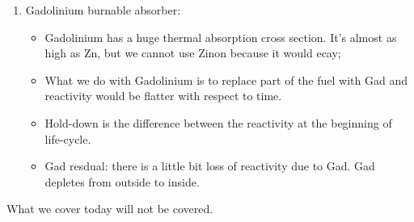 \documentclass{school-22.211-notes}
\begin{document}
\begin{enumerate}
\item Gadolinium burnable absorber: 
  \begin{itemize}
  \item Gadolinium has a huge thermal absorption cross section. It's almost as high as Zn, but we cannot use Zinon because it would ecay; 
  \item What we do with Gadolinium is to replace part of the fuel with Gad and reactivity would be flatter with respect to time. 
  \item Hold-down is the difference between the reactivity at the beginning of life-cycle. 
  \item Gad resdual: there is a little bit loss of reactivity due to Gad. Gad depletes from outside to inside. 
  \end{itemize}
\end{enumerate} 

What we cover today will not be covered. 
\end{document}
